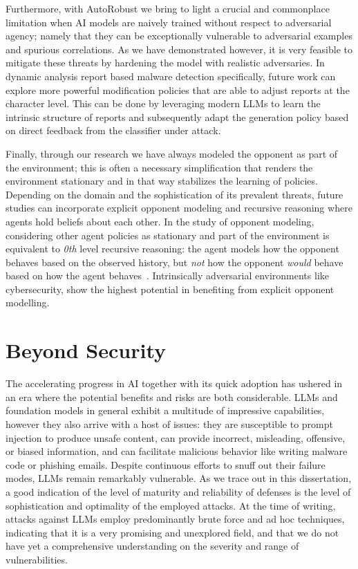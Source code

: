 Furthermore, with AutoRobust we bring to light a crucial and commonplace limitation when AI models are naively trained without respect to adversarial agency; namely that they can be exceptionally vulnerable to adversarial examples and spurious correlations.
As we have demonstrated however, it is very feasible to mitigate these threats by hardening the model with realistic adversaries.
In dynamic analysis report based malware detection specifically, future work can explore more powerful modification policies that are able to adjust reports at the character level.
This can be done by leveraging modern LLMs to learn the intrinsic structure of reports and subsequently adapt the generation policy based on direct feedback from the classifier under attack.

Finally, through our research we have always modeled the opponent as part of the environment; this is often a necessary simplification that renders the environment stationary and in that way stabilizes the learning of policies.
Depending on the domain and the sophistication of its prevalent threats, future studies can incorporate explicit opponent modeling and recursive reasoning where agents hold beliefs about each other.
In the study of opponent modeling, considering other agent policies as stationary and part of the environment is equivalent to \textit{0th} level recursive reasoning:
the agent models how the opponent behaves based on the observed history, but \emph{not} how the opponent \emph{would} behave based on how the agent behaves~\cite{albrecht2018autonomous, wen2019probabilistic}.
Intrinsically adversarial environments like cybersecurity, show the highest potential in benefiting from explicit opponent modelling.

\section{Beyond Security}

The accelerating progress in \gls{AI} together with its quick adoption has ushered in an era where the potential benefits and risks are both considerable.
LLMs and foundation models in general exhibit a multitude of impressive capabilities, however they also arrive with a host of issues: they are susceptible to prompt injection to produce unsafe content, can provide incorrect, misleading, offensive, or biased information, and can facilitate malicious behavior like writing malware code or phishing emails.
Despite continuous efforts to snuff out their failure modes, LLMs remain remarkably vulnerable.
As we trace out in this dissertation, a good indication of the level of maturity and reliability of defenses is the level of sophistication and optimality of the employed attacks.
At the time of writing, attacks against LLMs employ predominantly brute force and ad hoc techniques, indicating that it is a very promising and unexplored field, and that we do not have yet a comprehensive understanding on the severity and range of vulnerabilities.

